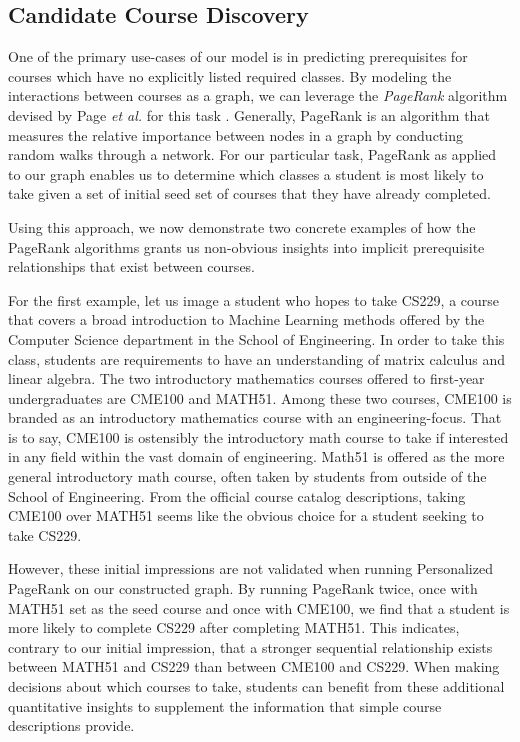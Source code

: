 \subsection{Candidate Course Discovery}
One of the primary use-cases of our model is in predicting prerequisites for courses which have no explicitly listed required classes. By modeling the interactions between courses as a graph, we can leverage the {\em PageRank} algorithm devised by Page \textit{et al.} for this task \cite{Page1999}. Generally, PageRank is an algorithm that measures the relative importance between nodes in a graph by conducting random walks through a network. For our particular task, PageRank as applied to our graph enables us to determine which classes a student is most likely to take given a set of initial seed set of courses that they have already completed.

Using this approach, we now demonstrate two concrete examples of how the PageRank algorithms grants us non-obvious insights into implicit prerequisite relationships that exist between courses. 

For the first example, let us image a student who hopes to take CS229, a course that covers a broad introduction to Machine Learning methods offered by the Computer Science department in the School of Engineering. In order to take this class, students are requirements to have an understanding of matrix calculus and linear algebra. The two introductory mathematics courses offered to first-year undergraduates are CME100 and MATH51. Among these two courses, CME100 is branded as an introductory mathematics course with an engineering-focus. That is to say, CME100 is ostensibly the introductory math course to take if interested in any field within the vast domain of engineering. Math51 is offered as the more general introductory math course, often taken by students from outside of the School of Engineering. From the official course catalog descriptions, taking CME100 over MATH51 seems like the obvious choice for a student seeking to take CS229.

However, these initial impressions are not validated when running Personalized PageRank on our constructed graph. By running PageRank twice, once with MATH51 set as the seed course and once with CME100, we find that a student is more likely to complete CS229 after completing MATH51. This indicates, contrary to our initial impression, that a stronger sequential relationship exists between MATH51 and CS229 than between CME100 and CS229. When making decisions about which courses to take, students can benefit from these additional quantitative insights to supplement the information that simple course descriptions provide.

